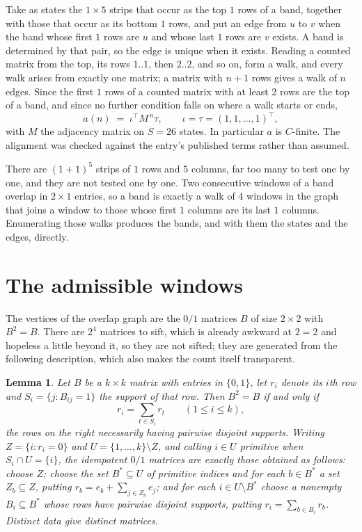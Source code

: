 \documentclass[11pt,a4paper]{article}
\theoremstyle{plain}
\newtheorem{lemma}[theorem]{Lemma}
\theoremstyle{definition}
\begin{document}
Take as states the $1\times5$ strips that occur as the top $1$ rows of a band,
together with those that occur as its bottom $1$ rows, and put an edge from $u$ to $v$
when the band whose first $1$ rows are $u$ and whose last $1$ rows are $v$ exists.
A band is determined by that pair, so the edge is unique when it exists. Reading a counted
matrix from the top, its rows $1..1$, then $2..2$, and so on, form a walk, and every
walk arises from exactly one matrix; a matrix with $n+1$ rows gives a walk of $n$ edges.
Since the first $1$ rows of a counted matrix with at least $2$ rows are the top of a
band, and since no further condition falls on where a walk starts or ends,
\[
a(n)\;=\;\iota^{\!\top}M^{\,n}\tau ,\qquad \iota=\tau=(1,1,\dots,1)^{\!\top},
\]
with $M$ the adjacency matrix on $S=26$ states. In particular $a$ is $C$-finite. The
alignment was checked against the entry's published terms rather than assumed.

There are $(1 + 1)^{5}$ strips of $1$ rows and $5$ columns, far too
many to test one by one, and they are not tested one by one. Two consecutive windows of a band
overlap in $2\times1$ entries, so a band is exactly a walk of $4$ windows in
the graph that joins a window to those whose first $1$ columns are its last $1$
columns. Enumerating those walks produces the bands, and with them the states and the edges,
directly.

\section{The admissible windows}

The vertices of the overlap graph are the $0/1$ matrices $B$ of size $2\times2$ with
$B^2=B$. There are $2^{4}$ matrices to sift, which is already awkward at $2=2$ and
hopeless a little beyond it, so they are not sifted; they are generated from the following
description, which also makes the count itself transparent.

\begin{lemma}\label{lem:idem}
Let $B$ be a $k\times k$ matrix with entries in $\{0,1\}$, let $r_i$ denote its $i$th row and
$S_i=\{j:B_{ij}=1\}$ the support of that row. Then $B^2=B$ if and only if
\[
r_i=\sum_{t\in S_i}r_t \qquad (1\le i\le k),
\]
the rows on the right necessarily having pairwise disjoint supports. Writing
$Z=\{i:r_i=0\}$ and $U=\{1,\dots,k\}\setminus Z$, and calling $i\in U$ \emph{primitive}
when $S_i\cap U=\{i\}$, the idempotent $0/1$ matrices are exactly those obtained as follows:
choose $Z$; choose the set $B^{\ast}\subseteq U$ of primitive indices and for each
$b\in B^{\ast}$ a set $Z_b\subseteq Z$, putting $r_b=e_b+\sum_{j\in Z_b}e_j$; and for each
$i\in U\setminus B^{\ast}$ choose a nonempty $B_i\subseteq B^{\ast}$ whose rows have
pairwise disjoint supports, putting $r_i=\sum_{b\in B_i}r_b$. Distinct data give distinct
matrices.
\end{lemma}
\end{document}
